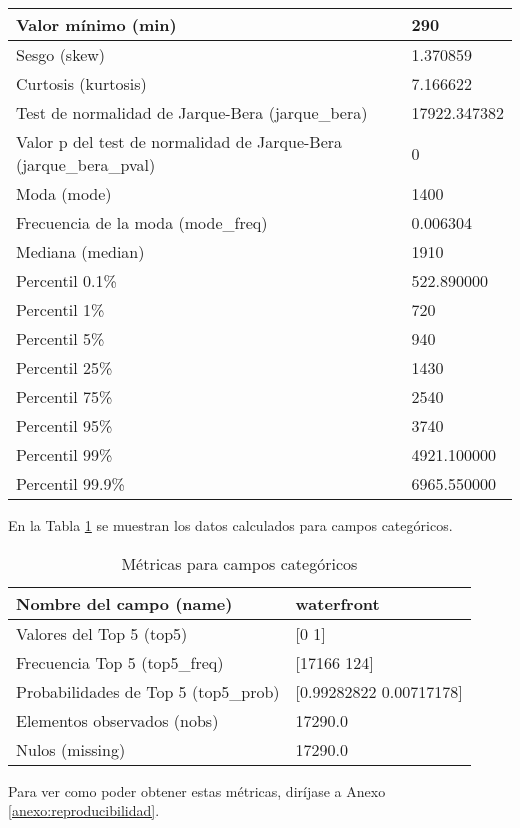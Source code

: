 \begin{longtable}{|m{10em}|m{25em}|}
    Valor mínimo (min) & 290 \\ \hline
    Sesgo (skew) & 1.370859 \\ \hline
    Curtosis (kurtosis) & 7.166622 \\ \hline
    Test de normalidad de Jarque-Bera (jarque\_bera) & 17922.347382 \\ \hline
    Valor p del test de normalidad de Jarque-Bera (jarque\_bera\_pval) & 0 \\ \hline
    Moda (mode) & 1400 \\ \hline
    Frecuencia de la moda (mode\_freq) & 0.006304 \\ \hline
    Mediana (median) & 1910 \\ \hline
    Percentil 0.1\% & 522.890000 \\ \hline
    Percentil 1\% & 720 \\ \hline
    Percentil 5\% & 940 \\ \hline
    Percentil 25\% & 1430 \\ \hline
    Percentil 75\% & 2540 \\ \hline
    Percentil 95\% & 3740 \\ \hline
    Percentil 99\% & 4921.100000 \\ \hline
    Percentil 99.9\% & 6965.550000 \\ \hline
\end{longtable}

En la Tabla \ref{metricas-categoricas} se muestran los datos calculados para campos categóricos.

\begin{table}[H]
    \centering
    \caption{Métricas para campos categóricos}
    \label{metricas-categoricas}
    \begin{tabular}{|m{10em}|m{25em}|}
        \hline
        \rowcolor[gray]{0.8}
        Nombre del campo (name) & waterfront \\ \hline
        Valores del Top 5 (top5) & [0 1] \\ \hline
        Frecuencia Top 5 (top5\_freq) & [17166   124] \\ \hline
        Probabilidades de Top 5 (top5\_prob) & [0.99282822 0.00717178] \\ \hline
        Elementos observados (nobs) & 17290.0 \\ \hline
        Nulos (missing) & 17290.0 \\ \hline
    \end{tabular}
\end{table}

Para ver como poder obtener estas métricas, diríjase a Anexo \ref{anexo:reproducibilidad}.